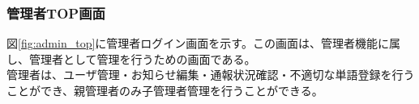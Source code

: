 \documentclass[a4j]{jarticle}
\begin{document}


\subsubsection{管理者TOP画面}
図\ref{fig:admin_top}に管理者ログイン画面を示す。この画面は、管理者機能に属し、管理者として管理を行うための画面である。\\
管理者は、ユーザ管理・お知らせ編集・通報状況確認・不適切な単語登録を行うことができ、親管理者のみ子管理者管理を行うことができる。
\end{document}
